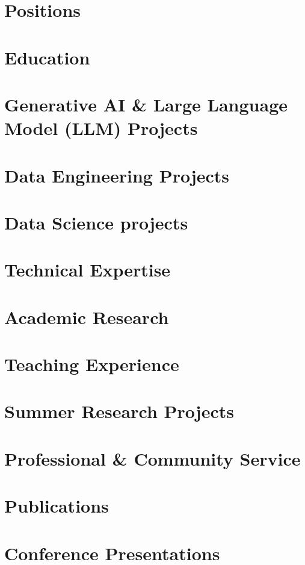 \documentclass[letter,10.99pt]{article}
\begin{document}
\pagestyle{plain}
\thispagestyle{fancy}

\vspace*{-0.9em}



\section{Positions}


\section{Education}


\section{Generative AI \& Large Language Model (LLM) Projects}


\newpage

\section{Data Engineering Projects}


\section{Data Science projects}


\section{Technical Expertise}


\newpage

\section{Academic Research}


\section{Teaching Experience}


\section{Summer Research Projects}


\section{Professional \& Community Service}


\newpage

\section{Publications}


\section{Conference Presentations}

\end{document}

